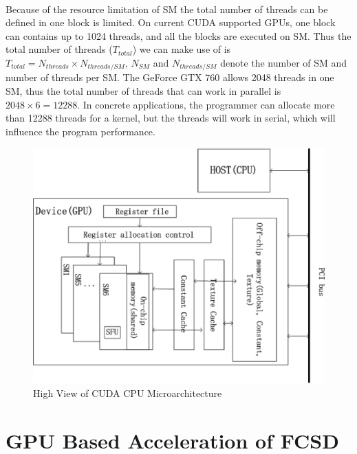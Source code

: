 \documentclass[12pt,a4paper,final]{article}
\begin{document}
\begin{spacing}{2.5}
\paragraph{}Because of the resource limitation of SM the total number of threads can be defined in one block is limited. On current CUDA supported GPUs, one block can contains up to 1024 threads, and all the blocks are executed on SM. Thus the total number of threads ($T_{total}$) we can make use of is $T_{total}=N_{threads}\times N_{threads/SM} $, $N_{SM}$ and $N_{threads/SM}$ denote the number of SM and number of threads per SM. The GeForce GTX 760 allows 2048 threads in one SM, thus the total number of threads that can work in parallel is $2048\times 6=12288$. In concrete applications, the programmer can allocate more than 12288 threads for a kernel, but the threads will work in serial, which will influence the program performance. 
\begin{figure}[htb]
\centering
\includegraphics[scale=0.6]{High_view_of_CUDA_GPU_microarchitecture.eps}
\caption{High View of CUDA CPU Microarchitecture}
\label{figure2}
\end{figure}   
\section{GPU Based Acceleration of FCSD}\label{GPUFCSD}

\end{spacing}
\end{document}
